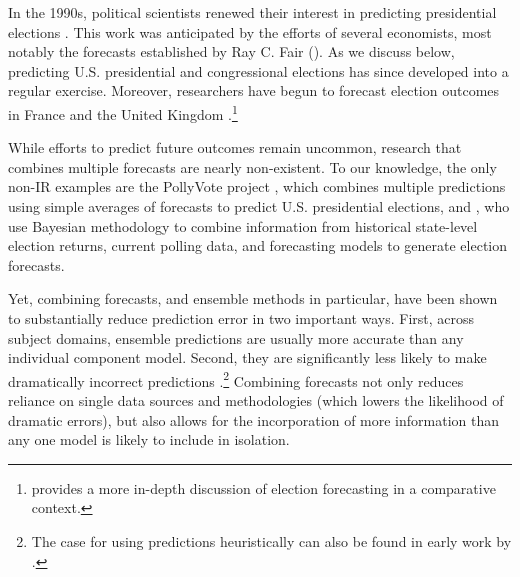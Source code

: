 \documentclass[12pt,fullpage,endnotes]{article}
\newcommand{\note}[1]{\footnote{ #1 \vspace{4 mm}}}
\begin{document}

In the 1990s, political scientists renewed their interest in
predicting presidential elections \citep{Campbell:1990,
  Campbell:1992}. This work was anticipated by the efforts of several
economists, most notably the forecasts established by Ray C. Fair
(\citeyear{Fair:1978}). As we discuss below, predicting
U.S. presidential and congressional elections has since developed into
a regular exercise.  Moreover, researchers have begun to forecast
election outcomes in France \citep[e.g.,][]{Jerome:1999} and the
United Kingdom
\citep[e.g.,][]{Whitely:2005}.\note{\citet{Lewis-Beck:2005} provides a
  more in-depth discussion of election forecasting in a comparative
  context.} 


While efforts to predict future outcomes remain uncommon, research
that combines multiple forecasts are nearly non-existent.  To our
knowledge, the only non-IR examples are the PollyVote project
\citep[c.f.][]{Graefe:2010}, which combines multiple predictions using
simple averages of forecasts to predict U.S. presidential elections,
and \citet{gelman:forecasts}, who use Bayesian methodology to combine
information from historical state-level election returns, current
polling data, and forecasting models to generate election forecasts.




Yet, combining forecasts, and ensemble methods in particular, have
been shown to substantially reduce prediction error in two important
ways.  First, across subject domains, ensemble predictions are usually
more accurate than any individual component model. Second, they are
significantly less likely to make dramatically incorrect predictions
\citep{Bates:1969, Armstrong:2001, Raftery:2005}.\note{The case for
  using predictions heuristically can also be found in early work by
  \citet{Dawid:1982, Dawid:1984}.}  Combining forecasts not only
reduces reliance on single data sources and methodologies (which
lowers the likelihood of dramatic errors), but also allows for the
incorporation of more information than any one model is likely to
include in isolation.
\end{document}
